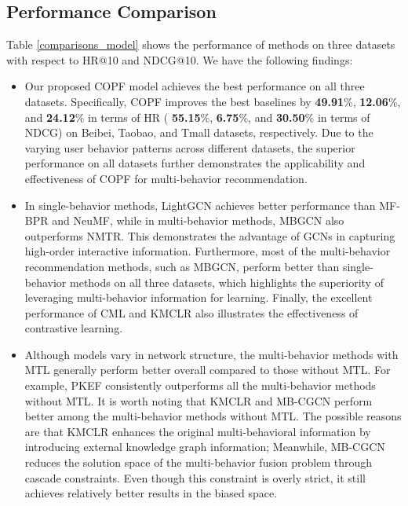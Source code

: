 \subsection{Performance Comparison}
\label{performance}
Table \ref{comparisons_model} shows the performance of methods on three datasets with respect to HR@10 and NDCG@10. 
We have the following findings:
\begin{itemize}

\item Our proposed COPF model achieves the best performance on all three datasets. Specifically, COPF improves the best baselines by \textbf{49.91$\%$}, \textbf{12.06$\%$}, and \textbf{ 24.12$\%$} in terms of HR ( \textbf{55.15$\%$}, \textbf{6.75$\%$}, and \textbf{30.50$\%$} in terms of NDCG) on Beibei, Taobao, and Tmall datasets, respectively. Due to the varying user behavior patterns across different datasets, the superior performance on all datasets further demonstrates the applicability and effectiveness of COPF for multi-behavior recommendation.

\item In single-behavior methods, LightGCN achieves better performance than MF-BPR and NeuMF, while in multi-behavior methods, MBGCN also outperforms NMTR. This demonstrates the advantage of GCNs in capturing high-order interactive information. Furthermore, most of the multi-behavior recommendation methods, such as MBGCN, perform better than single-behavior methods on all three datasets, which highlights the superiority of leveraging multi-behavior information for learning. Finally, the excellent performance of CML and KMCLR also illustrates the effectiveness of contrastive learning.

\item Although models vary in network structure, the multi-behavior methods with MTL generally perform better overall compared to those without MTL. For example, PKEF consistently outperforms all the multi-behavior methods without MTL. It is worth noting that KMCLR and MB-CGCN perform better among the multi-behavior methods without MTL. The possible reasons are that KMCLR enhances the original multi-behavioral information by introducing external knowledge graph information; Meanwhile, MB-CGCN reduces the solution space of the multi-behavior fusion problem through cascade constraints. Even though this constraint is overly strict, it still achieves relatively better results in the biased space.


\end{itemize}
